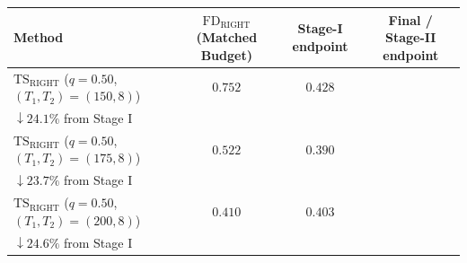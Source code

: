 \scriptsize
\setlength{\tabcolsep}{4pt}
\renewcommand{\arraystretch}{1.2}
\begin{tabular}{lccc}
\toprule
Method & $\mathrm{FD}_{\mathrm{RIGHT}}$ (Matched Budget) & Stage-I endpoint & Final / Stage-II endpoint \\
\midrule
$\mathrm{TS}_{\mathrm{RIGHT}}$ ($q=0.50$, $(T_1,T_2)=(150,8)$) & $0.752$ & $0.428$ & \shortstack[c]{$\mathbf{0.330}$\\{\scriptsize $\downarrow 24.1\%$ from Stage I}} \\
$\mathrm{TS}_{\mathrm{RIGHT}}$ ($q=0.50$, $(T_1,T_2)=(175,8)$) & $0.522$ & $0.390$ & \shortstack[c]{$\mathbf{0.315}$\\{\scriptsize $\downarrow 23.7\%$ from Stage I}} \\
$\mathrm{TS}_{\mathrm{RIGHT}}$ ($q=0.50$, $(T_1,T_2)=(200,8)$) & $0.410$ & $0.403$ & \shortstack[c]{$\mathbf{0.305}$\\{\scriptsize $\downarrow 24.6\%$ from Stage I}} \\
\bottomrule
\end{tabular}

